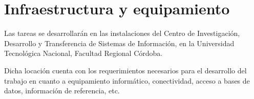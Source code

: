 \documentclass[
	11pt,oneside,a4paper,
	headsepline,footsepline,
	fleqn,
]{memoir}
\begin{document}
\section {Infraestructura y equipamiento}

Las tareas se desarrollarán en las instalaciones del Centro de Investigación, Desarrollo y Transferencia de Sistemas de Información, en la Universidad Tecnológica Nacional, Facultad Regional Córdoba.

Dicha locación cuenta con los requerimientos necesarios para el desarrollo del trabajo en cuanto a equipamiento informático, conectividad, acceso a bases de datos, información de referencia, etc.


\printbibliography[category=cited,title={Referencias}]

\printbibliography[title={Bibliografía adicional},prenote=bibnote,notcategory=cited]
\end{document}
